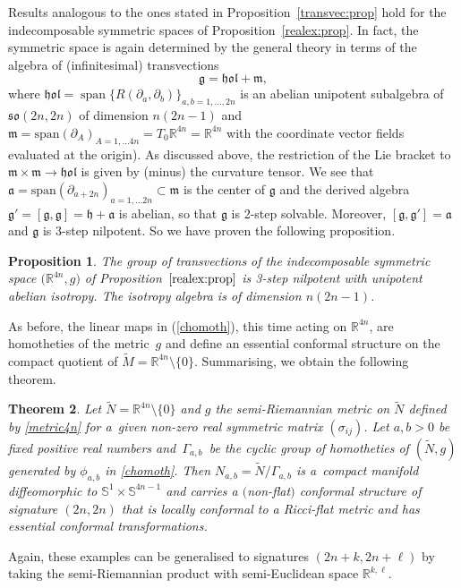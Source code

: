 \documentclass[pdftex]{sigma}
\numberwithin{equation}{section}
\newtheorem{Theorem}{Theorem}[section]
\newtheorem{Proposition}[Theorem]{Proposition}
 { \theoremstyle{definition}
\newtheorem{Definition}[Theorem]{Definition}
\newtheorem{Note}[Theorem]{Note}
\newtheorem{Example}[Theorem]{Example}
\newtheorem{Remark}[Theorem]{Remark} }
\renewcommand{\SS}{\ensuremath{\mathbb{S}}}
\newcommand{\1}{\mathbf{1}}
\newcommand{\bs}{\begin{Proposition}}
\newcommand{\es}{\end{Proposition}}
\newcommand{\btheo}{\begin{Theorem}}
\newcommand{\etheo}{\end{Theorem}}
\newcommand{\rr}{\mathbb{R}}
\newcommand{\g}{\mathfrak{g}}
\renewcommand{\a}{\mathfrak{a}}
\newcommand{\h}{\mathfrak{h}}
\newcommand{\m}{\mathfrak{m}}
\newcommand{\+}{\oplus}
\newcommand{\so}{\mathfrak{so}}
\newcommand{\del}{\partial}
\newcommand{\tM}{\widetilde{M}}
\renewcommand{\=}{\equiv}
\DeclareMathOperator{\Span}{\mathrm{span}}
\newcommand{\R}{\mathbb{R}}
\begin{document}
Results analogous to the ones stated in Proposition~\ref{transvec:prop} hold for the indecomposable symmetric spaces
of Proposition~\ref{realex:prop}. In fact, the symmetric space is {again} determined by the general theory in terms of the algebra of (infinitesimal) transvections
\[ {\g=\mathfrak{hol} +\m},\]
where ${\mathfrak{hol}} =\Span \{ R(\del_a,\del_b)\}_{{a,b=1,\ldots, 2n}}$ is an abelian unipotent subalgebra of $\so(2n,2n)$
of dimension $n(2n-1)$ and $\m=\mathrm{span}(\del_{A})_{A=1,\ldots 4n}{=T_0\R^{4n}=\R^{4n}}$ with
the coordinate vector fields evaluated at the origin). As discussed above, the restriction of the Lie bracket to $\mathfrak m \times \mathfrak m \to \mathfrak{hol}$ is given by (minus) the curvature tensor. We see that $\a=\mathrm{span}(\del_{a+2n})_{a=1,\ldots 2n}\subset \m$ is the center of $\g$ and the derived algebra $\g' =[\mathfrak g , \mathfrak g] =\h+\a$ is abelian, so that $\g$ is 2-step solvable. Moreover, $[\mathfrak g , \mathfrak g'] = \a$ and $\mathfrak g$ is 3-step nilpotent. So we have proven the following
proposition.

\bs %
The group of transvections of the indecomposable symmetric space $\bigl(\R^{4n},g\bigr)$ of Proposition~$\ref{realex:prop}$ is {\rm 3}-step nilpotent with unipotent abelian isotropy. The isotropy algebra is of dimension $n(2n-1)$.
\es

As before, the linear maps in (\ref{chomoth}), this time acting on $\R^{4n}$, are homotheties of the metric~$g$ and define an essential conformal structure on the compact quotient of $\tM=\R^{4n}\setminus \{0\}$. Summarising, we obtain the
following theorem.
\btheo \label{mainthm2}Let $\widetilde{N}=\rr^{4n}\setminus\{0\}$ and $g$ the semi-Riemannian metric on $\widetilde{N}$ defined by \eqref{metric4n} for a~given non-zero real symmetric matrix $(\sigma_{ij})$.
Let $a,b>0$ be fixed positive real numbers and~$\Gamma_{a,b} $~be the cyclic group of homotheties of $(\widetilde{N},g)$ generated by $\phi_{a,b}$ in \eqref{chomoth}. Then
${N_{a,b}=\widetilde{N}/\Gamma_{a,b}}$ is a~compact manifold diffeomorphic to $\SS^1\times \SS^{4n-1}$ and carries a $($non-flat$)$ conformal structure of signature $(2n,2n)$ that is locally conformal to a Ricci-flat metric and has essential conformal transformations.
\etheo


Again, these examples can be generalised to signatures $(2n+k,2n+\ell)$ by taking the semi-Riemannian product with semi-Euclidean space $\R^{k,\ell}$.
\end{document}

